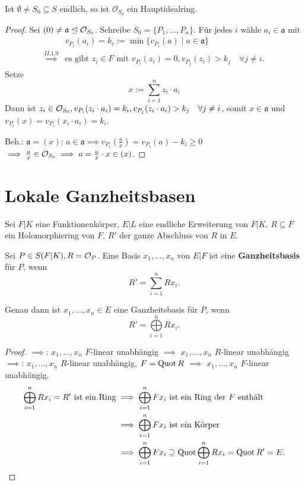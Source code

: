 \begin{satz}
    Ist $\emptyset \ne S_0 \subseteq S$ endlich, so ist $\mathcal{O}_{S_0}$ ein Hauptidealring.
\end{satz}
\begin{proof}
    Sei $(0) \ne \mathfrak{a} \trianglelefteq \mathcal{O}_{S_0}$. Schreibe $S_0 = \{P_1, \ldots, P_n\}$.
    Für jedes $i$ wähle $a_i \in \mathfrak{a}$ mit
    \begin{align*}
        & v_{P_i}(a_i) = k_i := \min \{v_{P_i}(a) \mid a \in \mathfrak{a}\}\\
        \stackrel{II.1.9}{\implies} & \text{es gibt } z_i \in F \text{ mit } v_{P_i}(z_i) = 0, v_{P_j}(z_i) > k_j \quad \forall j\ne i.
    \end{align*} 
    Setze $$x := \sum\limits_{i=1}^n z_i \cdot a_i$$
    Dann ist $z_i \in \mathcal{O}_{S_0}, v_{P_i}(z_i \cdot a_i) = k_i, v_{P_j}(z_i \cdot a_i) > k_j \quad \forall j \ne i$,
    somit $x \in \mathfrak{a}$ und $v_{P_i}(x) = v_{P_i}(x_i\cdot a_i) = k_i$.

    Beh.: $\mathfrak{a} = (x)$: $a \in \mathfrak{a} \implies v_{P_i}(\frac{a}{x}) = v_{P_i}(a) - k_i \geq 0$
    $\implies \frac{a}{x} \in \mathcal{O}_{S_0} \implies a = \frac{a}{x} \cdot x \in (x)$.
\end{proof}

\section{Lokale Ganzheitsbasen}
Sei $F|K$ eine Funktionenkörper, $E|L$ eine endliche Erweiterung von $F|K$, $R \subseteq F$ ein Holomorphiering von $F$,
$R'$ der ganze Abschluss von $R$ in $E$.

\begin{definition}
    Sei $P \in S(F|K), R = \mathcal{O}_P$. Eine Basis $x_1, \ldots, x_n$ von $E|F$ ist eine \textbf{Ganzheitsbasis} für $P$, wenn
    $$ R' = \sum\limits_{i=1}^n R x_i. $$
\end{definition}

\begin{lemma}
    Genau dann ist $x_1,\ldots,x_n\in E$ eine Ganzheitsbasis für $P$, wenn $$R' = \bigoplus\limits_{i=1}^n R x_i.$$
\end{lemma}
\begin{proof}
    $\implies$: $x_1, \ldots, x_n$ $F$-linear unabhängig $\implies$ $x_1, \ldots, x_n$ $R$-linear unabhängig\\
    $\implies$: $x_1,\ldots,x_n$ $R$-linear unabhängig, $F=\operatorname{Quot} R$ $\implies$ $x_1,\ldots,x_n$ $F$-linear unabhängig.
    \begin{align*}
        \bigoplus\limits_{i=1}^n Rx_i = R' \text{ ist ein Ring} & \implies \bigoplus\limits_{i=1}^n Fx_i \text{ ist ein Ring der }F \text{ enthält}\\
        & \implies \bigoplus\limits_{i=1}^n Fx_i \text{ ist ein Körper} \\
        & \implies \bigoplus\limits_{i=1}^n Fx_i \supseteq \operatorname{Quot} \bigoplus\limits_{i=1}^n Rx_i = \operatorname{Quot} R' = E.
    \end{align*}
\end{proof}

